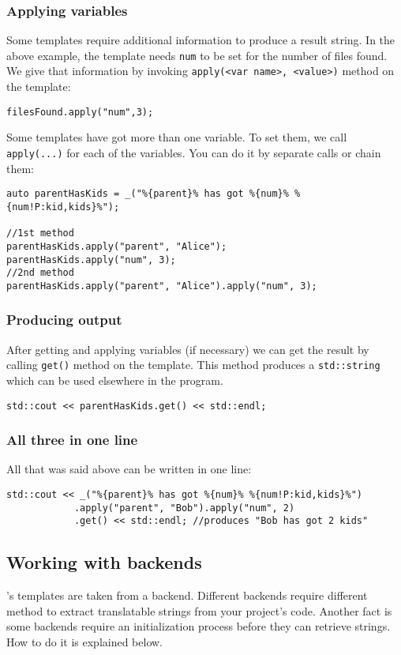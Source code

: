\subsubsection{Applying variables}
Some templates require additional information to produce a result string.
In the above example, the template needs \texttt{num} to be set for the number of files found.
We give that information by invoking \verb+apply(<var name>, <value>)+ method on the template:
\begin{verbatim}
filesFound.apply("num",3);
\end{verbatim}
Some templates have got more than one variable. To set them, we call \verb+apply(...)+ for each of the variables.
You can do it by separate calls or chain them:
\begin{verbatim}
auto parentHasKids = _("%{parent}% has got %{num}% %{num!P:kid,kids}%");

//1st method
parentHasKids.apply("parent", "Alice");
parentHasKids.apply("num", 3);
//2nd method
parentHasKids.apply("parent", "Alice").apply("num", 3);
\end{verbatim}

\subsubsection{Producing output}
After getting and applying variables (if necessary) we can get the result by calling \verb+get()+ method on the template.
This method produces a \verb+std::string+ which can be used elsewhere in the program.
\begin{verbatim}
std::cout << parentHasKids.get() << std::endl;
\end{verbatim}

\subsubsection{All three in one line}
All that was said above can be written in one line:
\begin{verbatim}
std::cout << _("%{parent}% has got %{num}% %{num!P:kid,kids}%")
			.apply("parent", "Bob").apply("num", 2)
			.get() << std::endl; //produces "Bob has got 2 kids"
\end{verbatim}

\subsection{Working with backends}
\mulan{}'s templates are taken from a backend. Different backends require different method to extract translatable strings from your project's code.
Another fact is some backends require an initialization process before they can retrieve strings. How to do it is explained below.
